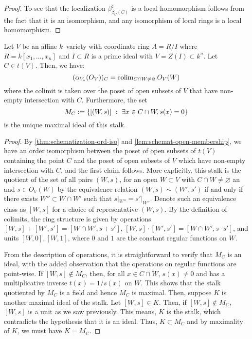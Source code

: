 \begin{proof}
To see that the localization $\beta^\sharp_{\beta_U(C)}$ is a local
homomorphism follows from the fact that it is an isomorphism, and any
isomorphism of local rings is a local homomorphism.
\end{proof}

\begin{lem}\label{lem:schemat-affine-var-local-ring}
Let $V$ be an affine $k$--variety with coordinate ring
$A = R/I$ where $R = k[x_1, \dots, x_n]$ and $I \subset R$ is a prime ideal
with $V = Z(I) \subset k^n$.
Let $C \in t(V)$.
Then, we have:
\[
(\alpha_{V_*}(O_V))_C = \operatorname{\mathrm{colim}}_{C \cap W \neq \varnothing} O_V(W)
\]
where the colimit is taken over the poset of open subsets of $V$
that have non-empty intersection with $C$.
Furthermore, the set
\[
M_C := \set[{[(W, s)]}]{\exists x \in C \cap W, s(x) = 0}
\]
is the unique maximal ideal of this stalk.
\end{lem}
\begin{proof}
By \cref{thm:schematization-ord-iso} and \cref{lem:schemat-open-membership},
we have an order isomorphism between the poset of open subsets of $t(V)$
containing the point $C$ and the poset of open subsets of $V$ which have
non-empty intersection with $C$, and the first claim follows. More
explicitly, this stalk is the quotient of the set of all pairs
$(W, s)$, for an open $W \subset V$ with $C \cap W \neq \varnothing$ an
and $s \in O_V(W)$ by the equivalence relation $(W, s) \sim (W', s')$
if and only if there exists $W'' \subset W \cap W'$ such that
$s|_{W''} = s'|_{W''}$. Denote such an equivalence class as $[W, s]$
for a choice of representative $(W, s)$. By the definition of colimits,
the ring structure is given by operations
$[W, s] + [W', s'] = [W \cap W', s + s']$,
$[W, s] \cdot [W', s'] = [W \cap W', s \cdot s']$, and units
$[W, 0], [W, 1]$, where $0$ and $1$ are the constant regular functions
on $W$.

From the description of operations, it is straightforward to verify
that $M_C$ is an ideal, with the added observation that the operations
on regular functions are point-wise. If $[W, s] \not\in M_C$,
then, for all $x \in C \cap W$, $s(x) \neq 0$ and has a multiplicative
inverse $t(x) = 1/s(x)$ on $W$. This shows that the stalk quotiented
by $M_C$ is a field and hence $M_C$ is maximal. Then, suppose
$K$ is another maximal ideal of the stalk. Let $[W, s] \in K$. Then,
if $[W, s] \not\in M_C$, $[W, s]$ is a unit as we saw previously.
This means, $K$ is the stalk, which contradicts the hypothesis that
it is an ideal. Thus, $K \subset M_C$ and by maximality of $K$,
we must have $K = M_C$.
\end{proof}

